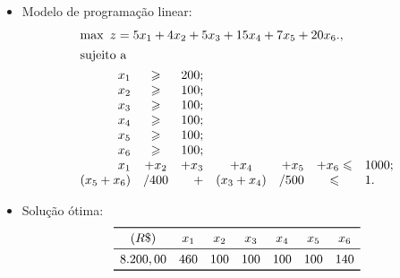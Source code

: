 \documentclass[12pt]{article}
\begin{document}
\begin{tcolorbox}[rounded corners, breakable,colback=yellow!5, colframe=red!40!black, title=\textbf{Modelo PL para o problema P-\myprob}]
\begin{itemize}[topsep=0pt]
\begin{enumerate}[topsep=0pt,itemsep=0pt]
   \end{enumerate}
%
    \item Modelo de programação linear:
    \small{
     $$\begin{array}{rcrcrcl}
        \multicolumn{7}{l}{\max\ z= 5x_1 + 4x_2 + 5x_3 + 15x_4 + 7x_5 + 20x_6.,} \\[4pt]
        \multicolumn{7}{l}{\text{sujeito a}} \\[4pt]
          x_1 & \geqslant & 200;\\
          x_2 & \geqslant & 100;\\
          x_3 & \geqslant & 100;\\
          x_4 & \geqslant & 100;\\
          x_5 & \geqslant & 100;\\
          x_6 & \geqslant & 100;\\
          x_1&+x_2 &+ x_3 &+ x_4 &+ x_5 &+ x_6 \leqslant & 1000;\\
          (x_5+x_6)&/400& +& (x_3+x_4)&/500 & \leqslant & 1.\\
       \end{array}$$
    }
%
    \item Solução ótima:
     $$
      \begin{array}{ccccccc}
      \toprule
      (R\$) & x_1 & x_2 & x_3 & x_4 & x_5 & x_6\\
      \midrule
      8.200,00  & 460 & 100 & 100 & 100 & 100 & 140 \\
      \bottomrule
      \end{array}
     $$
 \end{itemize}
\end{tcolorbox}
\end{document}
